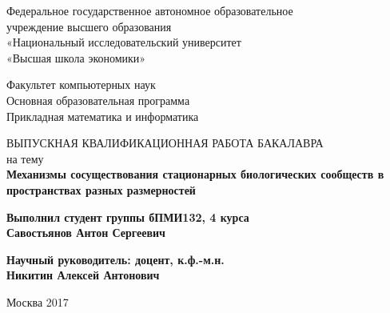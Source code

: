 %
\thispagestyle{empty}
\begin{center}
\thispagestyle{empty}
	\vspace{-60pt}
	{\large Федеральное государственное автономное образовательное \\
	учреждение высшего образования \\
	«Национальный исследовательский университет \\ «Высшая школа экономики»\\}

	\vspace{40pt}

	{\Large {Факультет компьютерных наук \\
	Основная образовательная программа \\
	Прикладная математика и информатика }}
	
	\vspace{40pt}
	
	{\Large ВЫПУСКНАЯ КВАЛИФИКАЦИОННАЯ РАБОТА БАКАЛАВРА} \\
	\vspace{5pt}
	{\large на тему} \\ 
	\vspace{5pt}
	{\Large \textbf{Механизмы сосуществования стационарных биологических сообществ в пространствах разных размерностей}}
\end{center}

\begin{flushright}
	\vspace{40 pt}
{\large \textbf{	Выполнил студент группы бПМИ132, 4 курса \\
	Савостьянов Антон Сергеевич}}
	
	\vspace{5 pt}
	{\large \textbf{Научный руководитель:
	доцент, к.ф.-м.н. \\
	Никитин Алексей Антонович}}
\end{flushright}
	\vfill
\begin{center} Москва 2017 \end{center}
\thispagestyle{empty}

\newpage

